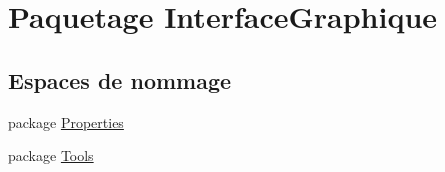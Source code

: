 \hypertarget{namespace_interface_graphique}{\section{Paquetage Interface\-Graphique}
\label{namespace_interface_graphique}
}
\subsection*{Espaces de nommage}
\begin{DoxyCompactItemize}
\item 
package \hyperlink{namespace_interface_graphique_1_1_properties}{Properties}
\item 
package \hyperlink{namespace_interface_graphique_1_1_tools}{Tools}
\end{DoxyCompactItemize}

